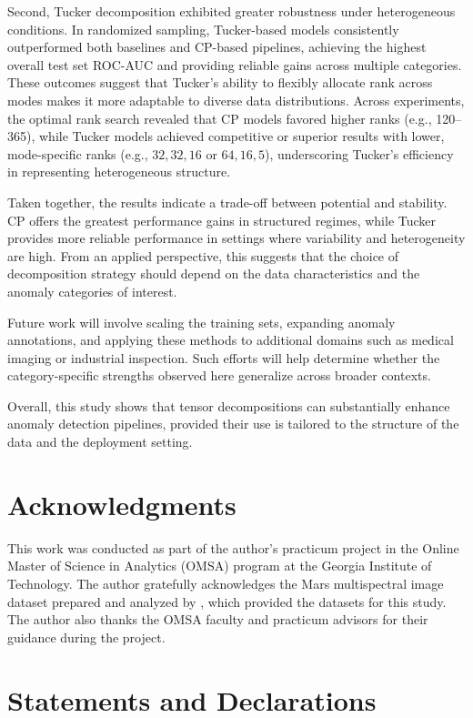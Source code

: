 \documentclass[pdflatex,sn-mathphys-ay]{sn-jnl}
\begin{document}
Second, Tucker decomposition exhibited greater robustness under heterogeneous conditions. In randomized sampling, Tucker-based models consistently outperformed both baselines and CP-based pipelines, achieving the highest overall test set ROC-AUC and providing reliable gains across multiple categories. These outcomes suggest that Tucker’s ability to flexibly allocate rank across modes makes it more adaptable to diverse data distributions. Across experiments, the optimal rank search revealed that CP models favored higher ranks (e.g., 120–365), while Tucker models achieved competitive or superior results with lower, mode-specific ranks (e.g., \(32,32,16\) or \(64,16,5\)), underscoring Tucker’s efficiency in representing heterogeneous structure.  

Taken together, the results indicate a trade-off between potential and stability. CP offers the greatest performance gains in structured regimes, while Tucker provides more reliable performance in settings where variability and heterogeneity are high. From an applied perspective, this suggests that the choice of decomposition strategy should depend on the data characteristics and the anomaly categories of interest.  

Future work will involve scaling the training sets, expanding anomaly annotations, and applying these methods to additional domains such as medical imaging or industrial inspection. Such efforts will help determine whether the category-specific strengths observed here generalize across broader contexts.  

Overall, this study shows that tensor decompositions can substantially enhance anomaly detection pipelines, provided their use is tailored to the structure of the data and the deployment setting.


\section*{Acknowledgments}
This work was conducted as part of the author’s practicum project in the Online Master of Science in Analytics (OMSA) program at the Georgia Institute of Technology. The author gratefully acknowledges the Mars multispectral image dataset prepared and analyzed by \citep{Kerner2020}, which provided the datasets for this study. The author also thanks the OMSA faculty and practicum advisors for their guidance during the project.

\section*{Statements and Declarations}
\end{document}
